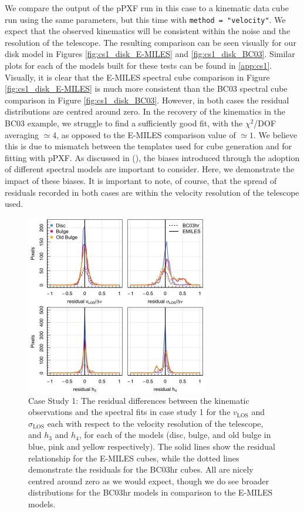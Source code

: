 \documentclass[
  journal=pasa,
  manuscript=research-paper, %
  year=2020,
  volume=37,
]{cup-journal}
\newcommand{\citetoggle}[1]{\citeauthor{#1} (\citeyear{#1})}
\begin{document}
We compare the output of the pPXF run in this case to a kinematic data cube run using the same parameters, but this time with \texttt{method = "velocity"}. 
We expect that the observed kinematics will be consistent within the noise and the resolution of the telescope. 
The resulting comparison can be seen visually for our disk model in Figures \ref{fig:cs1_disk_E-MILES} and \ref{fig:cs1_disk_BC03}. 
Similar plots for each of the models built for these tests can be found in \ref{app:cs1}.
Visually, it is clear that the E-MILES spectral cube comparison in Figure \ref{fig:cs1_disk_E-MILES} is much more consistent than the BC03 spectral cube comparison in Figure \ref{fig:cs1_disk_BC03}. 
However, in both cases the residual distributions are centred around zero. 
In the recovery of the kinematics in the \textsc{BC03} example, we struggle to find a sufficiently good fit, with the $\chi^2$/DOF averaging $\simeq 4$, as opposed to the E-MILES comparison value of $\simeq 1$. 
We believe this is due to mismatch between the templates used for cube generation and for fitting with pPXF. As discussed in \citetoggle{Nanni2023iMaNGASSP}, the biases introduced through the adoption of different spectral models are important to consider. Here, we demonstrate the impact of these biases. It is important to note, of course, that the spread of residuals recorded in both cases are within the velocity resolution of the telescope used.


\begin{figure}
    \centering
    \includegraphics[keepaspectratio, width=8cm]{cs1_histograms.jpeg}
    \caption{Case Study 1: The residual differences between the kinematic observations and the spectral fits in case study 1 for the $v_{\text{LOS}}$ and $\sigma_{\text{LOS}}$ each with respect to the velocity resolution of the telescope, and $h_3$ and $h_4$, for each of the models (disc, bulge, and old bulge in blue, pink and yellow respectively). The solid lines show the residual relationship for the E-MILES cubes, while the dotted lines demonstrate the residuals for the BC03hr cubes. All are nicely centred around zero as we would expect, though we do see broader distributions for the BC03hr models in comparison to the E-MILES models.}
    \label{fig:cs1_hist}
\end{figure}
\end{document}

